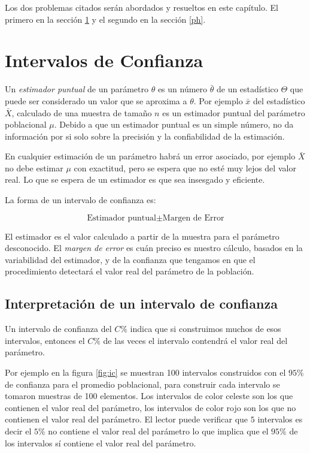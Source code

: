 \documentclass[]{book}
\begin{document}
Los dos problemas citados serán abordados y resueltos en este capítulo.
El primero en la sección \ref{ic} y el segundo en la sección \ref{ph}.

\section{Intervalos de Confianza}\label{ic}

Un \emph{estimador puntual} de un parámetro \(\theta\) es un número
\(\bar{\theta}\) de un estadístico \(\Theta\) que puede ser considerado
un valor que se aproxima a \(\theta\). Por ejemplo \(\bar{x}\) del
estadístico \(\bar{X}\), calculado de una muestra de tamaño \(n\) es un
estimador puntual del parámetro poblacional \(\mu\). Debido a que un
estimador puntual es un simple número, no da información por si solo
sobre la precisión y la confiabilidad de la estimación.

En cualquier estimación de un parámetro habrá un error asociado, por
ejemplo \(\bar{X}\) no debe estimar \(\mu\) con exactitud, pero se
espera que no esté muy lejos del valor real. Lo que se espera de un
estimador es que sea insesgado y eficiente.

La forma de un intervalo de confianza es:

\begin{equation} 
  \text{Estimador puntual} \pm \text{Margen de Error}
  \label{eq:ic}
\end{equation}

El estimador es el valor calculado a partir de la muestra para el
parámetro desconocido. El \emph{margen de error} es cuán preciso es
nuestro cálculo, basados en la variabilidad del estimador, y de la
confianza que tengamos en que el procedimiento detectará el valor real
del parámetro de la población.

\subsection{Interpretación de un intervalo de
confianza}\label{interpretacion-de-un-intervalo-de-confianza}

Un intervalo de confianza del \(C \%\) indica que si construimos muchos
de esos intervalos, entonces el \(C \%\) de las veces el intervalo
contendrá el valor real del parámetro.

Por ejemplo en la figura \ref{fig:ic} se muestran 100 intervalos
construidos con el \(95 \%\) de confianza para el promedio poblacional,
para construir cada intervalo se tomaron muestras de 100 elementos. Los
intervalos de color celeste son los que contienen el valor real del
parámetro, los intervalos de color rojo son los que no contienen el
valor real del parámetro. El lector puede verificar que \(5\) intervalos
es decir el \(5 \%\) no contiene el valor real del parámetro lo que
implica que el \(95 \%\) de los intervalos sí contiene el valor real del
parámetro.
\end{document}
